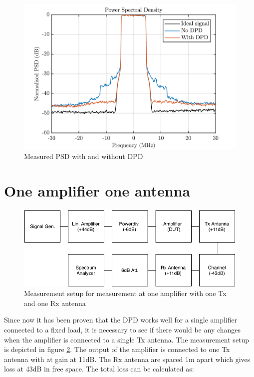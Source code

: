 \begin{figure}[H]
\centering 
\includegraphics[scale = 0.7]{figures/measurement/cree/meas1/PSD_1.png}
\caption{Measured PSD with and without DPD}
\label{fig:meas_amp_PSD}
\end{figure}

\section{One amplifier one antenna}

\begin{figure}[H]
\centering 
\includegraphics[scale = 0.9]{figures/measurement/cree/meas2/meas2.pdf}
\caption{Measurement setup for measurement at one amplifier with one Tx and one Rx antenna}
\label{fig:meas_amp2}
\end{figure}

Since now it has been proven that the DPD works well for a single amplifier connected to a fixed load, it is necessary to see if there would be any changes when the amplifier is connected to a single Tx antenna. The measurement setup is depicted in figure \ref{fig:meas_amp2}. The output of the amplifier is connected to one Tx antenna with at gain at 11dB. The Rx antenna are spaced 1m apart which gives loss at 43dB in free space. The total loss can be calculated as:

